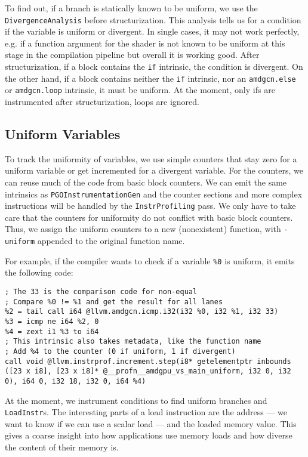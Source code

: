 To find out, if a branch is statically known to be uniform, we use the \texttt{DivergenceAnalysis} before structurization.
This analysis tells us for a condition if the variable is uniform or divergent.
In single cases, it may not work perfectly, e.g. if a function argument for the shader is not known to be uniform at this stage in the compilation pipeline but overall it is working good.
After structurization, if a block contains the \texttt{if} intrinsic, the condition is divergent.
On the other hand, if a block contains neither the \texttt{if} intrinsic, nor an \texttt{amdgcn.else} or \texttt{amdgcn.loop} intrinsic, it must be uniform.
At the moment, only ifs are instrumented after structurization, loops are ignored.

\subsection{Uniform Variables}
\label{sub:impl_uniform_vars}
To track the uniformity of variables, we use simple counters that stay zero for a uniform variable or get incremented for a divergent variable.
For the counters, we can reuse much of the code from basic block counters.
We can emit the same intrinsics as \texttt{PGOInstrumentationGen} and the counter sections and more complex instructions will be handled by the \texttt{InstrProfiling} pass.
We only have to take care that the counters for uniformity do not conflict with basic block counters.
Thus, we assign the uniform counters to a new (nonexistent) function, with \texttt{-uniform} appended to the original function name.

For example, if the compiler wants to check if a variable \texttt{\%0} is uniform, it emits the following code:
\begin{lstlisting}[caption={Check a variable for uniformity},language={[x86masm]Assembler}]
%1 = tail call i32 @llvm.amdgcn.readfirstlane(i32 %0)
; The 33 is the comparison code for non-equal
; Compare %0 != %1 and get the result for all lanes
%2 = tail call i64 @llvm.amdgcn.icmp.i32(i32 %0, i32 %1, i32 33)
%3 = icmp ne i64 %2, 0
%4 = zext i1 %3 to i64
; This intrinsic also takes metadata, like the function name
; Add %4 to the counter (0 if uniform, 1 if divergent)
call void @llvm.instrprof.increment.step(i8* getelementptr inbounds ([23 x i8], [23 x i8]* @__profn__amdgpu_vs_main_uniform, i32 0, i32 0), i64 0, i32 18, i32 0, i64 %4)
\end{lstlisting}

At the moment, we instrument conditions to find uniform branches and \texttt{LoadInstr}s.
The interesting parts of a load instruction are the address --- we want to know if we can use a scalar load --- and the loaded memory value.
This gives a coarse insight into how applications use memory loads and how diverse the content of their memory is.

